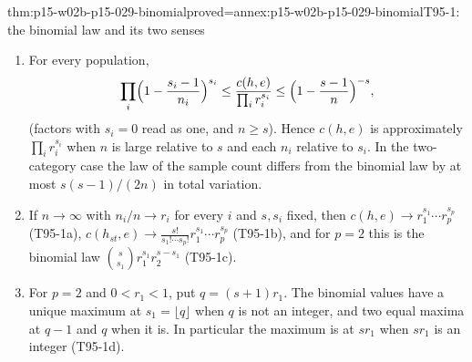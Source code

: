 \begin{hbtheorem}{thm:p15-w02b-p15-029-binomial}{proved=annex:p15-w02b-p15-029-binomial}{T95-1: the binomial law and its two senses}
\begin{enumerate}
 \item[(A)] For every population,
       \[
        \prod_i\Bigl(1-\frac{s_i-1}{n_i}\Bigr)^{s_i}
        \leq\frac{c(h,e)}{\prod_i r_i^{s_i}}
        \leq\Bigl(1-\frac{s-1}{n}\Bigr)^{-s},
       \]
       (factors with \(s_i=0\) read as one, and \(n\geq s\)). Hence
       \(c(h,e)\) is approximately \(\prod_ir_i^{s_i}\) when \(n\) is
       large relative to \(s\) and each \(n_i\) relative to \(s_i\).
       In the two-category case the law of the sample count differs from
       the binomial law by at most \(s(s-1)/(2n)\) in total variation.
 \item[(B)] If \(n\to\infty\) with \(n_i/n\to r_i\) for every
       \(i\) and \(s,s_i\) fixed, then
       \(c(h,e)\to r_1^{s_1}\cdots r_p^{s_p}\) (T95-1a),
       \(c(h_{st},e)\to\frac{s!}{s_1!\cdots s_p!}r_1^{s_1}\cdots r_p^{s_p}\)
       (T95-1b), and for \(p=2\) this is the binomial law
       \(\binom s{s_1}r_1^{s_1}r_2^{s-s_1}\) (T95-1c).
 \item[(d)] For \(p=2\) and \(0<r_1<1\), put \(q=(s+1)r_1\). The
       binomial values have a unique maximum at \(s_1=\lfloor q\rfloor\)
       when \(q\) is not an integer, and two equal maxima at \(q-1\)
       and \(q\) when it is. In particular the maximum is at \(sr_1\)
       when \(sr_1\) is an integer (T95-1d).
\end{enumerate}
\end{hbtheorem}

